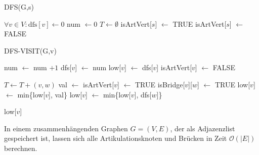 \begin{algorithm}
    \caption{DFS(G,s)}
    \begin{algorithmic}[1]
        \State $\forall v \in V : \text{dfs}[v] \leftarrow 0$
        \State num $\leftarrow 0$ 
        \State $T \leftarrow \emptyset$ 
        \State {}
            \State isArtVert[$s$] $\leftarrow$ TRUE
        \Else
        \State isArtVert[$s$] $\leftarrow$ FALSE
        \EndIf
    \end{algorithmic}
\end{algorithm}
\pagebreak
\begin{algorithm}
    \caption{DFS-VISIT(G,v)}
    \begin{algorithmic}[1]
        \State num $\leftarrow$ num $ + 1$
        \State dfs[$v$] $\leftarrow$ num
        \State low[$v$] $\leftarrow$ dfs[$v$]
        \State isArtVert[$v$] $\leftarrow$ FALSE

                \State $T \leftarrow T + (v,w)$
                \State val $\leftarrow$  
                \State isArtVert[$v$] $\leftarrow$ TRUE
                        \State isBridge[$v$][$w$] $\leftarrow$ TRUE
                    \EndIf
                \EndIf
                \State low[$v$] $\leftarrow$ min\{low[$v$], val\}
            \Else {}
                \State low[$v$] $\leftarrow$ min\{low[$v$], dfs[$w$]\}
            \EndIf
        \EndFor

        \State \Return low[$v$]
    \end{algorithmic}
\end{algorithm}


\begin{satz}[Satz]
    In einem zusammenhängenden Graphen $G = (V,E)$, der als Adjazenzlist gespeichert ist, lassen sich
    alle Artikulationsknoten und Brücken in Zeit $\mathcal{O}(|E|)$ berechnen.
\end{satz}
\bigskip